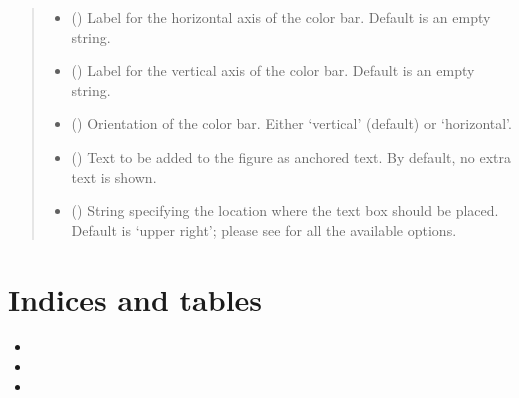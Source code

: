 \documentclass[letterpaper,10pt,english]{sphinxmanual}
\begin{document}
\begin{fulllineitems}
\begin{quote}
\begin{description}
\begin{itemize}
\item {} 
 () \textendash{} Label for the horizontal axis of the color bar. Default is an empty string.

\item {} 
 () \textendash{} Label for the vertical axis of the color bar. Default is an empty string.

\item {} 
 () \textendash{} Orientation of the color bar. Either ‘vertical’ (default) or ‘horizontal’.

\item {} 
 () \textendash{} Text to be added to the figure as anchored text. By default, no extra text is shown.

\item {} 
 () \textendash{} String specifying the location where the text box should be placed. Default is ‘upper right’;
please see  for all the available options.

\end{itemize}

\end{description}\end{quote}

\end{fulllineitems}



\chapter{Indices and tables}
\label{\detokenize{index:indices-and-tables}}\begin{itemize}
\item {} 

\item {} 

\item {} 

\end{itemize}
\end{document}
